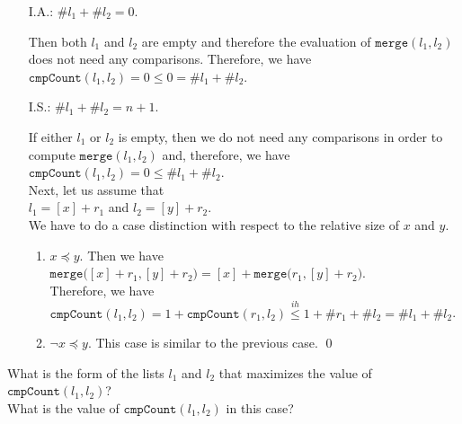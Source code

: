 \begin{enumerate}
\item[I.A.:] $\#l_1 + \#l_2=0$.

             Then both $l_1$ and $l_2$ are empty and therefore the evaluation of
             $\mathtt{merge}(l_1, l_2)$ does not need any comparisons.  Therefore, we have 
             \\[0.2cm]
             \hspace*{1.3cm}
             $\mathtt{cmpCount}(l_1, l_2) = 0 \leq 0 = \#l_1 + \#l_2$.
\item[I.S.:] $\#l_1 + \#l_2 = n+1$.

             If either $l_1$ or $l_2$ is empty, then we do not need any comparisons in order to
             compute $\mathtt{merge}(l_1, l_2)$ and, therefore, we have
             \\[0.2cm]
             \hspace*{1.3cm}
             $\mathtt{cmpCount}(l_1,l_2) = 0 \leq \#l_1 + \#l_2$.
             \\[0.2cm]
             Next, let us assume that \\[0.2cm]
             \hspace*{1.3cm} $l_1 = [x] + r_1$ \quad and \quad $l_2 = [y] + r_2$.
             \\[0.2cm]
             We have to do a case distinction with respect to the relative size of $x$ and $y$.
             \begin{enumerate}
             \item $x \preceq y$.  Then we have \\[0.2cm]
                   \hspace*{1.3cm} 
                   $\mathtt{merge}\bigl([x] + r_1, [y] + r_2\bigr) = [x] + \mathtt{merge}\bigl(r_1, [y] + r_2\bigr)$. 
                   \\[0.2cm]
                   Therefore, we have \\
                   $\mathtt{cmpCount}(l_1, l_2) = 1 + \mathtt{cmpCount}(r_1, l_2) \stackrel{ih}{\leq} 1 + \#r_1 + \#l_2 = \#l_1 + \#l_2$.
             \item $\neg x \preceq y$.  This case is similar to the previous case. 
                   \qed
             \end{enumerate}
\end{enumerate}
\exercise
What is the form of the lists $l_1$ and $l_2$ that maximizes the value of 
\\[0.2cm]
\hspace*{1.3cm}
$\mathtt{cmpCount}(l_1, l_2)$?
\\[0.2cm]
What is the value of $\mathtt{cmpCount}(l_1, l_2)$ in this case? \eox
\vspace*{0.3cm}

